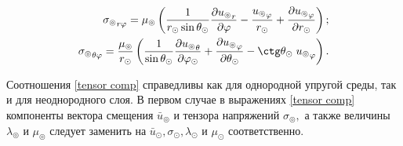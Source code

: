 \begin{equation}
\begin{gathered}
\begin{aligned}
        {\sigma_\circledcirc}_{r\varphi}=\mu_\circledcirc\left(\frac1{r_\odot\sin\theta_\odot} \frac{\partial {u_\circledcirc}_r}{\partial\varphi} - \frac{{u_\circledcirc}_\varphi}{r_\odot} + \frac{\partial {u_\circledcirc}_\varphi}{\partial r_\odot}\right);\\
        {\sigma_\circledcirc}_{\theta\varphi}=\frac{\mu_\circledcirc} {r_\odot}\left(\frac1{\sin\theta_\odot} \frac{\partial {u_\circledcirc}_\theta}{\partial\varphi_\odot} + \frac{\partial {u_\circledcirc}_\varphi}{\partial\theta_\odot} - \ctg\theta_\odot \;{u_\circledcirc}_\varphi \right).\\
    \end{aligned}
    \end{gathered}
\end{equation}

Соотношения \eqref{tensor comp} справедливы как для однородной упругой среды, так и для неоднородного слоя. В первом случае в выражениях \eqref{tensor comp} компоненты вектора смещения $\bar{u}_\circledcirc$ и тензора напряжений $\sigma_\circledcirc,$ а также величины $\lambda_\circledcirc$ и $\mu_\circledcirc$ следует заменить на $\bar{u}_\odot, \sigma_\odot, \lambda_\odot$ и $\mu_\odot$ соответственно.

